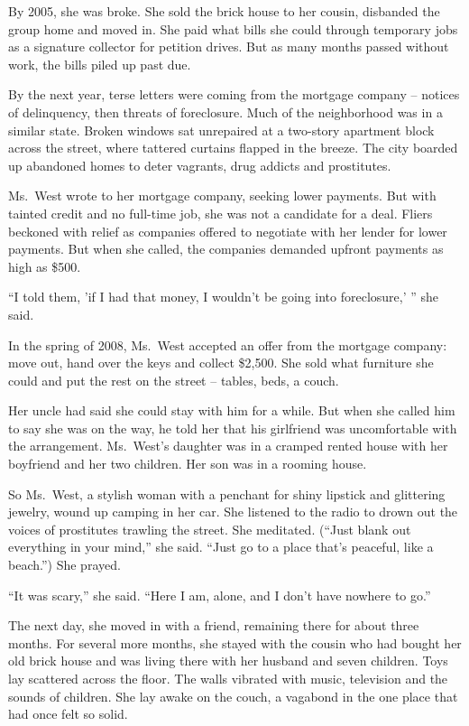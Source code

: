﻿\documentclass[12pt]{article}
\begin{document}
By 2005, she was broke. She sold the brick house to her cousin, disbanded the group home and moved
in. She paid what bills she could through temporary jobs as a signature collector for petition
drives. But as many months passed without work, the bills piled up past due.

By the next year, terse letters were coming from the mortgage company -- notices of delinquency,
then threats of foreclosure. Much of the neighborhood was in a similar state. Broken windows sat
unrepaired at a two-story apartment block across the street, where tattered curtains flapped in the
breeze. The city boarded up abandoned homes to deter vagrants, drug addicts and prostitutes.

Ms.~West wrote to her mortgage company, seeking lower payments. But with tainted credit and no
full-time job, she was not a candidate for a deal. Fliers beckoned with relief as companies offered
to negotiate with her lender for lower payments. But when she called, the companies demanded upfront
payments as high as \$500.

``I told them, 'if I had that money, I wouldn't be going into foreclosure,' '' she said.

In the spring of 2008, Ms.~West accepted an offer from the mortgage company: move out, hand over the
keys and collect \$2,500. She sold what furniture she could and put the rest on the street --
tables, beds, a couch.

Her uncle had said she could stay with him for a while. But when she called him to say she was on
the way, he told her that his girlfriend was uncomfortable with the arrangement. Ms.~West's daughter
was in a cramped rented house with her boyfriend and her two children. Her son was in a rooming
house.

So Ms.~West, a stylish woman with a penchant for shiny lipstick and glittering jewelry, wound up
camping in her car. She listened to the radio to drown out the voices of prostitutes trawling the
street. She meditated. (``Just blank out everything in your mind,'' she said. ``Just go to a place
that's peaceful, like a beach.'') She prayed.

``It was scary,'' she said. ``Here I am, alone, and I don't have nowhere to go.''

The next day, she moved in with a friend, remaining there for about three months. For several more
months, she stayed with the cousin who had bought her old brick house and was living there with her
husband and seven children. Toys lay scattered across the floor. The walls vibrated with music,
television and the sounds of children. She lay awake on the couch, a vagabond in the one place that
had once felt so solid.
\end{document}
